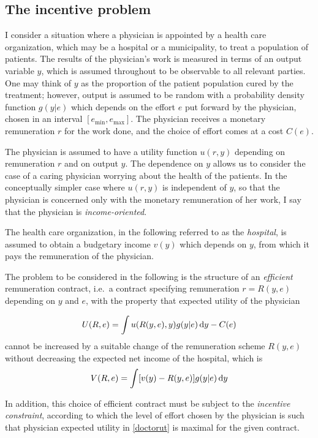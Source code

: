 \subsection{The incentive problem} %
\label{sub:the_incentive_problem}
I consider a situation where a physician is appointed by a health care organization, which may be a hospital or a municipality, to treat a population of patients. The results of the physician's work is measured in terms of an output variable $y$, which is assumed throughout to be observable to all relevant parties. One may think of $y$ as the proportion of the patient population cured by the treatment; however, output is assumed to be random with a probability density function $g(y|e)$ which depends on the effort $e$ put forward by the physician, chosen in an interval $\left[e_{\min},e_{\max}\right]$. The physician receives a monetary remuneration $r$ for the work done, and the choice of effort comes at a cost $C(e)$.

The physician is assumed to have a utility function $u(r,y)$ depending on remuneration $r$ and on output $y$. The dependence on $y$ allows us to consider the case of a caring physician worrying about the health of the patients. In the conceptually simpler case where $u(r,y)$ is independent of $y$, so that the physician is concerned only with the monetary remuneration of her work, I say that the physician is \emph{income-oriented}.

The health care organization, in the following referred to as the \emph{hospital}, is assumed to obtain a budgetary income $v(y)$ which depends on $y$, from which it pays the remuneration of the physician.

The problem to be considered in the following is the structure of an \emph{efficient} remuneration contract, i.e.\ a contract specifying remuneration $r=R(y,e)$ depending on $y$ and $e$, with the property that expected utility of the physician

\begin{align}
	\label{doctorut}                         
	U(R,e)=\int u(R(y,e),y)g(y|e)\dif y-C(e) 
\end{align}
cannot be increased by a suitable change of the remuneration scheme $R(y,e)$ without decreasing the expected net income of the hospital, which is
\[
	V(R,e)=\int [v(y)-R(y,e)]g(y|e)\dif y
\]

In addition, this choice of efficient contract must be subject to the \emph{incentive constraint}, according to which the level of effort chosen by the physician is such that physician expected utility in \cref{doctorut} is maximal for the given contract.

